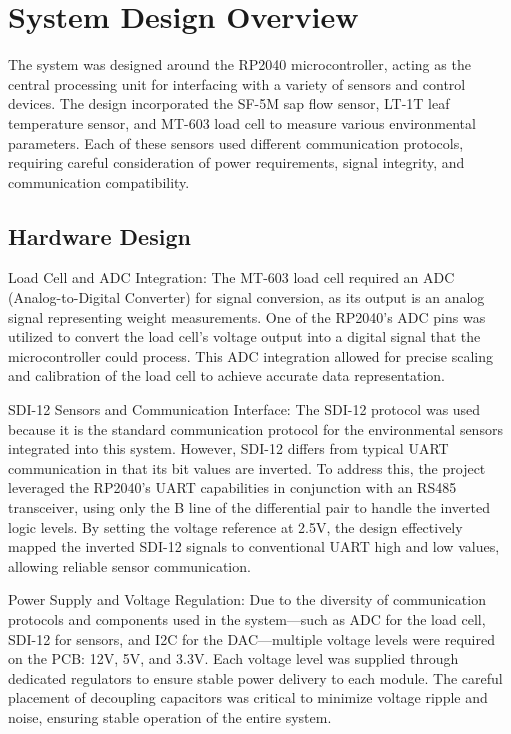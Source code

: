 \section{System Design Overview}

The system was designed around the RP2040 microcontroller, acting as the central processing unit for interfacing with a variety of sensors and control devices. The design incorporated the SF-5M sap flow sensor, LT-1T leaf temperature sensor, and MT-603 load cell to measure various environmental parameters. Each of these sensors used different communication protocols, requiring careful consideration of power requirements, signal integrity, and communication compatibility.

\subsection{Hardware Design}
Load Cell and ADC Integration: The MT-603 load cell required an ADC (Analog-to-Digital Converter) for signal conversion, as its output is an analog signal representing weight measurements. One of the RP2040's ADC pins was utilized to convert the load cell's voltage output into a digital signal that the microcontroller could process. This ADC integration allowed for precise scaling and calibration of the load cell to achieve accurate data representation.

SDI-12 Sensors and Communication Interface: The SDI-12 protocol was used because it is the standard communication protocol for the environmental sensors integrated into this system. However, SDI-12 differs from typical UART communication in that its bit values are inverted. To address this, the project leveraged the RP2040's UART capabilities in conjunction with an RS485 transceiver, using only the B line of the differential pair to handle the inverted logic levels. By setting the voltage reference at 2.5V, the design effectively mapped the inverted SDI-12 signals to conventional UART high and low values, allowing reliable sensor communication.

Power Supply and Voltage Regulation: Due to the diversity of communication protocols and components used in the system—such as ADC for the load cell, SDI-12 for sensors, and I2C for the DAC—multiple voltage levels were required on the PCB: 12V, 5V, and 3.3V. Each voltage level was supplied through dedicated regulators to ensure stable power delivery to each module. The careful placement of decoupling capacitors was critical to minimize voltage ripple and noise, ensuring stable operation of the entire system.

